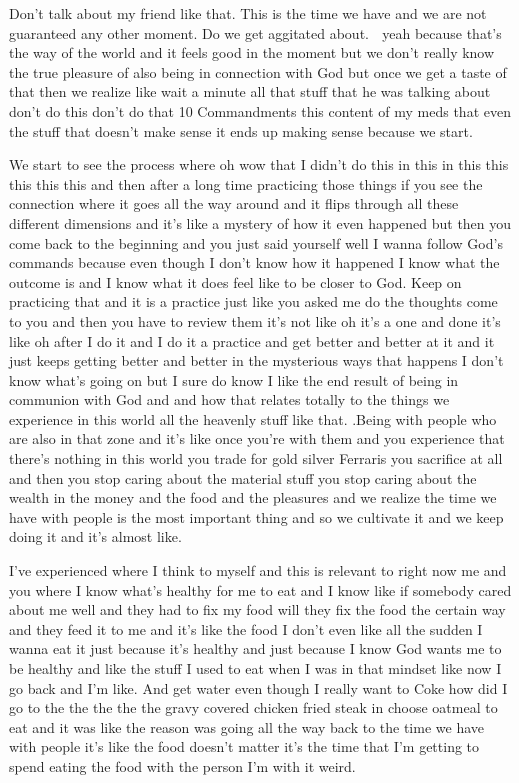 \documentclass{article}
\begin{document}
\begin{multicols}{3}
\closearticle


Don't talk about my friend like that.  This is the time we have and we are not guaranteed any other moment.  Do we get aggitated about.   yeah because that's the way of the world and it feels good in the moment but we don't really know the true pleasure of also being in connection with God but once we get a taste of that then we realize like wait a minute all that stuff that he was talking about don't do this don't do that 10 Commandments this content of my meds that even the stuff that doesn't make sense it ends up making sense because we start.  

We start to see the process where oh wow that I didn't do this in this in this this this this this and then after a long time practicing those things if you see the connection where it goes all the way around and it flips through all these different dimensions and it's like a mystery of how it even happened but then you come back to the beginning and you just said yourself well I wanna follow God's commands because even though I don't know how it happened I know what the outcome is and I know what it does feel like to be closer to God. Keep on practicing that and it is a practice just like you asked me do the thoughts come to you and then you have to review them it's not like oh it's a one and done it's like oh after I do it and I do it a practice and get better and better at it and it just keeps getting better and better in the mysterious ways that happens I don't know what's going on but I sure do know I like the end result of being in communion with God and and how that relates totally to the things we experience in this world all the heavenly stuff like that. .Being with people who are also in that zone and it's like once you're with them and you experience that there's nothing in this world you trade for gold silver Ferraris you sacrifice at all and then you stop caring about the material stuff you stop caring about the wealth in the money and the food and the pleasures and we realize the time we have with people is the most important thing and so we cultivate it and we keep doing it and it's almost like.  

I've experienced where I think to myself and this is relevant to right now me and you where I know what's healthy for me to eat and I know like if somebody cared about me well and they had to fix my food will they fix the food the certain way and they feed it to me and it's like the food I don't even like all the sudden I wanna eat it just because it's healthy and just because I know God wants me to be healthy and like the stuff I used to eat when I was in that mindset like now I go back and I'm like.  And get water even though I really want to Coke how did I go to the the the the the gravy covered chicken fried steak in choose oatmeal to eat and it was like the reason was going all the way back to the time we have with people it's like the food doesn't matter it's the time that I'm getting to spend eating the food with the person I'm with it weird.  


\end{multicols}
\end{document}
